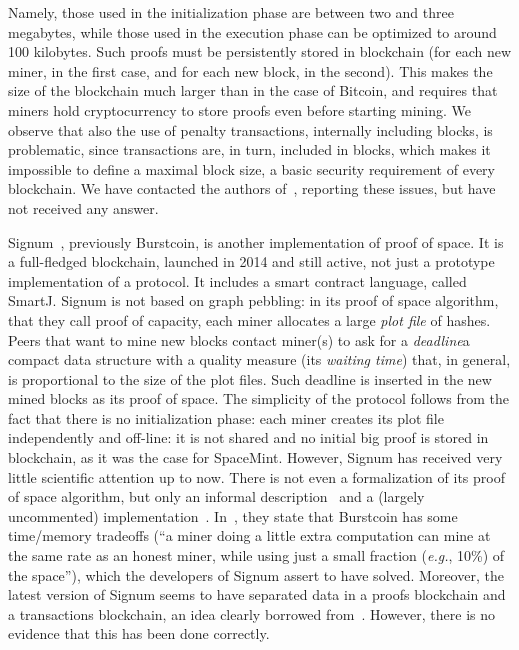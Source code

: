 Namely, those used in the initialization phase are between two and three megabytes, while those used
in the execution phase can be optimized to around 100 kilobytes. Such proofs must be persistently stored in
blockchain (for each new miner, in the first case, and for each new block, in the second).
This makes the size of the blockchain much larger than in the case of Bitcoin, and requires
that miners hold cryptocurrency to store proofs even before starting mining.
We observe that also the use of penalty transactions, internally including blocks, is problematic, since
transactions are, in turn, included in blocks, which makes it impossible to define
a maximal block size, a basic security requirement of every blockchain.
We have contacted the authors of~\cite{ParkKFGAP18}, reporting these issues,
but have not received any answer.

Signum~\cite{Signum}, previously Burstcoin, is another implementation of proof of space.
It is a full-fledged blockchain, launched in 2014 and still active,
not just a prototype implementation of a protocol. It includes a smart contract language, called SmartJ.
Signum is not based on graph pebbling: in its proof of space algorithm, that they
call proof of capacity, each miner allocates a large \emph{plot file} of hashes.
Peers that want to mine new blocks contact miner(s) to ask for a
\emph{deadline}\ie a compact data structure with a quality measure (its \emph{waiting time}) that,
in general, is proportional to the size of the plot files. Such deadline is
inserted in the new mined blocks as its proof of space. The simplicity of the protocol
follows from the fact that there is no initialization phase: each miner creates its plot file
independently and off-line: it is not shared and no initial big proof is stored in
blockchain, as it was the case for SpaceMint.
However, Signum has received very little scientific
attention up to now. There is not even a formalization of its proof of space algorithm,
but only an informal description~\cite{SignumPlotting} and a (largely uncommented)
implementation~\cite{SignumSource}.
In~\cite{ParkKFGAP18}, they state that Burstcoin has some
time/memory tradeoffs (``a miner doing a little extra computation can mine at the same
rate as an honest miner, while using just a small fraction (\emph{e.g.}, 10\%) of the space''),
which the developers of Signum assert to have solved. Moreover, the latest version of Signum
seems to have separated data in a proofs blockchain and a transactions blockchain,
an idea clearly borrowed from~\cite{ParkKFGAP18}. However, there is no evidence that this has been done
correctly.

